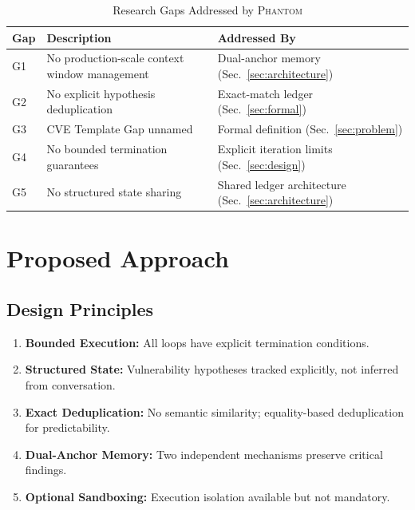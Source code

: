 \documentclass[11pt,a4paper]{article}
\theoremstyle{definition}
\newcommand{\phantom}{\textsc{Phantom}}
\begin{document}
\begin{table}[H]
\centering
\caption{Research Gaps Addressed by \phantom{}}
\label{tab:gaps}
\begin{tabularx}{\textwidth}{@{}l X l@{}}
\toprule
\textbf{Gap} & \textbf{Description} & \textbf{Addressed By} \\
\midrule
G1 & No production-scale context window management & Dual-anchor memory (Sec.~\ref{sec:architecture}) \\
G2 & No explicit hypothesis deduplication & Exact-match ledger (Sec.~\ref{sec:formal}) \\
G3 & CVE Template Gap unnamed & Formal definition (Sec.~\ref{sec:problem}) \\
G4 & No bounded termination guarantees & Explicit iteration limits (Sec.~\ref{sec:design}) \\
G5 & No structured state sharing & Shared ledger architecture (Sec.~\ref{sec:architecture}) \\
\bottomrule
\end{tabularx}
\end{table}

\section{Proposed Approach}
\label{sec:approach}

\subsection{Design Principles}

\begin{enumerate}[label=\textbf{P\arabic*:}, leftmargin=2em]
    \item \textbf{Bounded Execution:} All loops have explicit termination conditions.
    \item \textbf{Structured State:} Vulnerability hypotheses tracked explicitly, not inferred from conversation.
    \item \textbf{Exact Deduplication:} No semantic similarity; equality-based deduplication for predictability.
    \item \textbf{Dual-Anchor Memory:} Two independent mechanisms preserve critical findings.
    \item \textbf{Optional Sandboxing:} Execution isolation available but not mandatory.
\end{enumerate}
\end{document}
